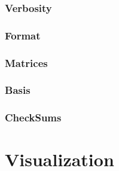 \documentclass[titlepage,12pt,twoside]{report}
\begin{document}
\subsubsection{Verbosity}
\subsubsection{Format}
\subsubsection{Matrices}
\subsubsection{Basis}
\subsubsection{CheckSums}
\section{Visualization}
\end{document}
